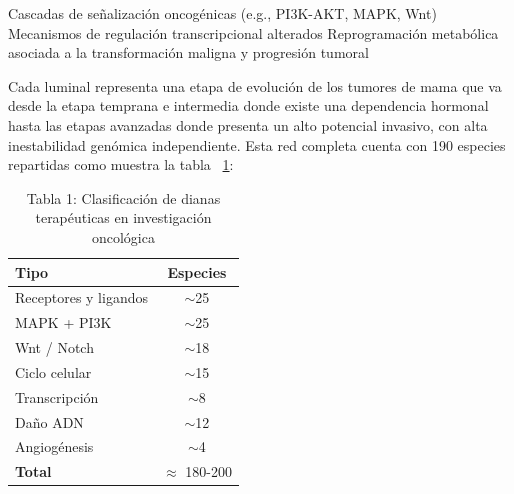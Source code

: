 \documentclass[12pt,spanish]{article}
\begin{document}
	Cascadas de señalización oncogénicas (e.g., PI3K-AKT, MAPK, Wnt)
	Mecanismos de regulación transcripcional alterados
	Reprogramación metabólica asociada a la transformación maligna y progresión tumoral
	
	Cada luminal representa una etapa de evolución de los tumores de mama que va desde la etapa temprana e intermedia donde existe una dependencia hormonal hasta las etapas avanzadas donde presenta un alto potencial invasivo, con alta inestabilidad genómica independiente. Esta red completa cuenta con 190 especies repartidas como muestra la tabla ~\ref{tab:terapeuticas}:
	\begin{table}[h]
		\centering
		\caption{Tabla 1: Clasificación de dianas terapéuticas en investigación oncológica}
		\begin{tabular}{|l|c|}
			\hline
			\textbf{Tipo} & \textbf{Especies} \\
			\hline
			Receptores y ligandos & $\sim$25 \\
			MAPK + PI3K & $\sim$25 \\
			Wnt / Notch & $\sim$18 \\
			Ciclo celular & $\sim$15 \\
			Transcripción & $\sim$8 \\
			Daño ADN & $\sim$12 \\
			Angiogénesis & $\sim$4 \\
			\hline
			\textbf{Total} & $\approx$ 180-200 \\
			\hline
		\end{tabular}
		\label{tab:terapeuticas}
	\end{table}
	
\end{document}
